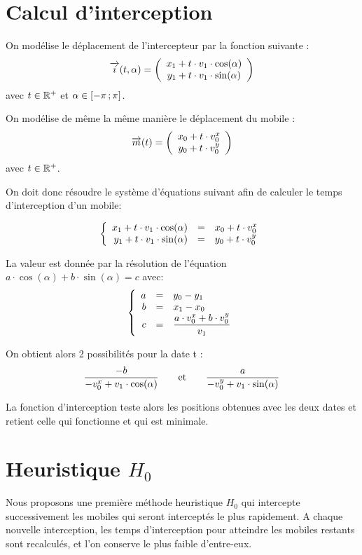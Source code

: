 \section{Calcul d'interception}

On modélise le déplacement de l'intercepteur par la fonction suivante : 
\[
\overrightarrow{i}(t,\alpha) = 
\left(
\begin{array}{c}
 x_1 + t \cdot v_1 \cdot \cos(\alpha)\\
 y_1 + t \cdot v_1 \cdot \sin(\alpha)
\end{array}
\right)
\]
avec $t \in \mathbb{R}^+$ et $\alpha \in \mathopen{[}-\pi\mathclose{}\mathpunct{};\pi\mathclose{]}$.

On modélise de même la même manière le déplacement du mobile :
\[
\overrightarrow{m}(t) = 
\left(
\begin{array}{c}
 x_0 + t \cdot v^{x}_0\\
 y_0 + t \cdot v^{y}_0
\end{array}
\right)
\]
avec $t \in \mathbb{R}^+$.

On doit donc résoudre le système d'équations suivant afin de calculer le temps d'interception d'un mobile:

\[
\left\{
\begin{array}{r c l}
x_1 + t \cdot v_1 \cdot \cos(\alpha) &=& x_0 + t \cdot v^{x}_0\\
y_1 + t \cdot v_1 \cdot \sin(\alpha) &=& y_0 + t \cdot v^{y}_0
\end{array}
\right.
\]

La valeur est donnée par la résolution de l'équation $a \cdot \cos(\alpha)+b \cdot \sin(\alpha) = c$ avec:
\[
\left\{
\begin{array}{r c l}
a &=& y_0 - y_1\\
b &=& x_1 - x_0\\
c &=& \displaystyle \frac{a \cdot v^{x}_0 +b \cdot v^{y}_0}{v_1}
\end{array}
\right.
\]

On obtient alors 2 possibilités pour la date t : 
\[ \frac{-b}{-v^{x}_0 + v_1 \cdot \cos(\alpha)}  \qquad\text{et}\qquad \frac{a}{-v^{y}_0 + v_1 \cdot \sin(\alpha)} \]

La fonction d'interception teste alors les positions obtenues avec les deux dates et retient celle qui fonctionne et qui est minimale.

\section{Heuristique $H_0$}
	Nous proposons une première méthode heuristique $H_0$ qui intercepte successivement les mobiles qui seront interceptés le plus rapidement. 
	A chaque nouvelle interception, les temps d'interception pour atteindre les mobiles restants sont recalculés, et l'on conserve le plus faible d'entre-eux.

